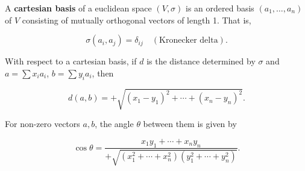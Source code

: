 A \textbf{cartesian basis} of a euclidean space $(V, \sigma)$ is an ordered basis $(a_1, \ldots, a_n)$ of $V$ consisting of mutually orthogonal vectors of length 1. That is,

$$\sigma(a_i, a_j) = \delta_{ij} \quad (\text{Kronecker delta}).$$

With respect to a cartesian basis, if $d$ is the distance determined by $\sigma$ and $a = \sum x_i a_i$, $b = \sum y_i a_i$, then

$$d(a, b) = +\sqrt{(x_1 - y_1)^2 + \cdots + (x_n - y_n)^2}.$$

For non-zero vectors $a, b$, the angle $\theta$ between them is given by

$$\cos \theta = \frac{x_1 y_1 + \cdots + x_n y_n}{+\sqrt{(x_1^2 + \cdots + x_n^2)(y_1^2 + \cdots + y_n^2)}}.$$
